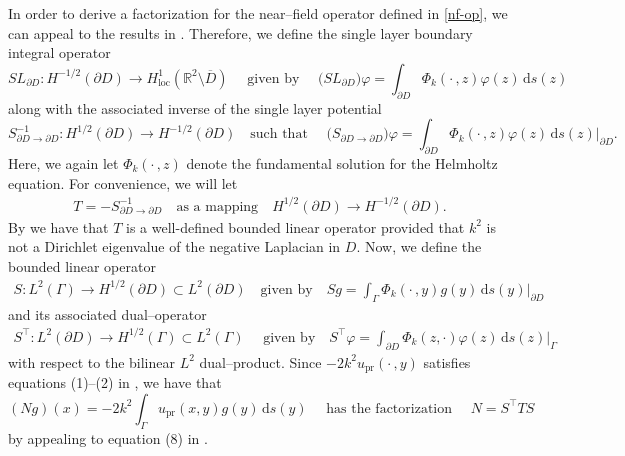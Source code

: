 \documentclass{article}
\newcommand{\R}{\mathbb{R}}
\newcommand{\dd}{\mathrm{d}}
\numberwithin{equation}{section}
\begin{document}
In order to derive a factorization for the near--field operator defined in \eqref{nf-op}, we can appeal to the results in \cite{nf-fft-dsm}. Therefore, we define the single layer boundary integral operator 
$$SL_{\partial D}: H^{-1/2}(\partial D) \longrightarrow H^1_{\text{loc}} (\R^2 \setminus\overline{D}) \quad \text{ given by } \quad \big(SL_{\partial D}\big) \varphi= \int_{\partial D} \Phi_k( \cdot \, ,  z ) \varphi (z) \, \text{d}s(z)$$
along with the associated inverse of the single layer potential   
$$S^{-1}_{\partial D \to \partial D} : H^{1/2}(\partial D) \longrightarrow H^{-1/2}(\partial D) \quad \text{such that } \quad  \big(S_{\partial D \to \partial D} \big) \varphi =\int_{\partial D} \Phi_k ( \cdot \, ,  z) \varphi(z) \, \text{d}s(z) \Big|_{\partial D}.$$
Here, we again let $\Phi_k( \cdot \, ,  z ) $ denote the fundamental solution for the Helmholtz equation. For convenience, we will let 
\begin{align}\label{T-operator}
T= - S^{-1}_{\partial D \to \partial D} \quad \text{as a mapping} \quad H^{1/2}(\partial D) \longrightarrow H^{-1/2}(\partial D). 
\end{align} 
By \cite[Lemma 1.14]{kirschbook} we have that $T$ is a well-defined bounded linear operator provided that $k^2$ is not a Dirichlet eigenvalue of the negative Laplacian in $D$. Now, we define the bounded linear operator 
\begin{align}\label{sl-op1}
S : L^2(\Gamma)  \longrightarrow H^{1/2}(\partial D) \subset L^2(\partial D) \quad  \text{given by} \quad   S g = \int_{\Gamma}  \Phi_k( \cdot \, , y)  g(y) \, \text{d}s(y) \Big|_{\partial D} 
\end{align}
and its associated dual--operator 
\begin{align}\label{sl-op2}
S^{\top} : L^2(\partial D)  \longrightarrow H^{1/2}(\Gamma) \subset L^2(\Gamma) \quad  \text{ given by} \quad S^{\top} \varphi = \int_{\partial D}  \Phi_k( z , \cdot)  \varphi(z) \, \text{d}s(z) \Big|_{\Gamma}
\end{align}
with respect to the bilinear $L^2$ dual--product. Since $-2k^2 u_\textrm{pr} ( \cdot \, , y)$ satisfies equations (1)--(2) in \cite{nf-fft-dsm}, we have that 
$$(N g)(x) =  -2k^2 \int_{\Gamma} u_\textrm{pr} ( x , y) g(y) \, \dd s(y)  \quad \text{ has the factorization } \quad N = S^\top T S$$
by appealing to equation (8) in \cite{nf-fft-dsm}.  
\end{document}
